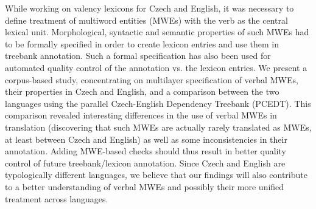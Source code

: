While working on valency lexicons for Czech and English, it was necessary to define treatment of multiword entities (MWEs) with the verb as the central
 lexical unit. Morphological, syntactic and semantic properties of such MWEs had
 to be formally specified in order to create lexicon entries and use them in
 treebank annotation. Such a formal specification has also been used for
 automated quality control of the annotation vs. the lexicon entries. We present
 a corpus-based study, concentrating on multilayer specification of verbal MWEs,
 their properties in Czech and English, and a comparison between the two
 languages using the parallel Czech-English Dependency Treebank (PCEDT). This
 comparison revealed interesting differences in the use of verbal MWEs in
 translation (discovering that such MWEs are actually rarely translated as MWEs,
 at least between Czech and English) as well as some inconsistencies in their
 annotation. Adding MWE-based checks should thus result in better quality
 control of future treebank/lexicon annotation. Since Czech and English are
 typologically different languages, we believe that our findings will also
 contribute to a better understanding of verbal MWEs and possibly their more
 unified treatment across languages.

